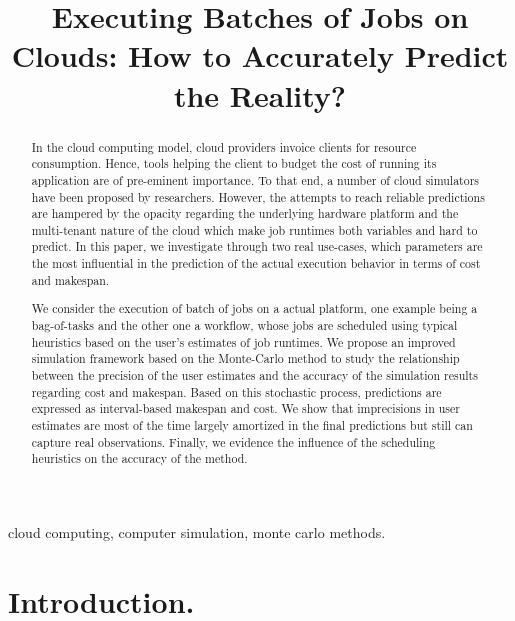 \documentclass[10pt,conference,compsocconf]{IEEEtran}
\title{Executing Batches of Jobs on Clouds: How to Accurately Predict the Reality?}
\author{\IEEEauthorblockN{Luke~Bertot 
			and Stéphane~Genaud 
			and Julien~Gossa}
	\IEEEauthorblockA{Icube-ICPS --- UMR 7357, Univeristé de Strasbourg, CNRS\\
		P\^ole API Blvd S. Bant, 67400 Illkirch\\
		email: \url{lbertot@unistra.fr}, \url{genaud@unistra.fr}, \url{gossa@unistra.fr}}
	}
\begin{document}
\maketitle

\begin{abstract}
  In the  cloud computing  model, cloud providers  invoice clients  for resource
  consumption. Hence, tools helping the client to budget the cost of running its
  application are  of pre-eminent  importance. To  that end,  a number  of cloud
  simulators have been  proposed by researchers. However, the  attempts to reach
  reliable  predictions are  hampered by  the opacity  regarding the  underlying
  hardware platform  and the  multi-tenant nature  of the  cloud which  make job
  runtimes both  variables and hard to  predict.  In this paper,  we investigate
  through two real  use-cases, which parameters are the most  influential in the
  prediction of the actual execution behavior in terms of cost and makespan.

  We consider the execution  of batch of jobs on a  actual platform, one example
  being a  bag-of-tasks and the other  one a workflow, whose  jobs are scheduled
  using typical  heuristics based on  the user's  estimates of job  runtimes.  We
  propose an  improved simulation framework  based on the Monte-Carlo  method to
  study the  relationship between the  precision of  the user estimates  and the
  accuracy of the simulation results regarding  cost and makespan. Based on this
  stochastic process,  predictions are expressed as  interval-based makespan and
  cost.   We show  that imprecisions  in  user estimates  are most  of the  time
  largely amortized in the final predictions but still can capture real
  observations. Finally, we evidence the influence of the scheduling heuristics
  on the accuracy of the method.
 
\end{abstract}

\begin{IEEEkeywords}
cloud computing, computer simulation, monte carlo methods.
\end{IEEEkeywords}

\section{Introduction.}
\end{document}

